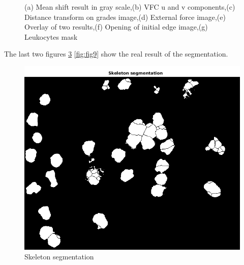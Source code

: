 \begin{figure}[htbp]
\begin{subfigure}[b]{0.45\textwidth}
        \caption{ }
        \label{fig:fig7}
    \end{subfigure}

    
    \caption{(a) Mean shift result in gray scale,(b) VFC u and v components,(c) Distance transform on grades image,(d) External force image,(e) Overlay of two results,(f) Opening of initial edge image,(g) Leukocytes mask}
    \label{fig:alltheprocess}
\end{figure}
The last two figures \ref{fig:fig8} \ref{fig:fig9} show the real result of the segmentation.

\begin{figure}
\centering
	\begin{center}
		\includegraphics[scale=0.5]{img/final/figure8.png}
		\caption{Skeleton segmentation}
		\label{fig:fig8}
	\end{center}
\end{figure}
